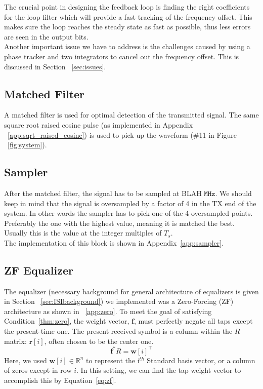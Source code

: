 \documentclass[]{article}
\begin{document}
The crucial point in designing the feedback loop is finding the right coefficients for the loop filter which will provide a fast tracking of the frequency offset. This makes sure the loop reaches the steady state as fast as possible, thus less errors are seen in the output bits. \\

Another important issue we have to address is the challenges caused by using a phase tracker and two integrators to cancel out the frequency offset. This is discussed in Section ~\ref{sec:issues}.


\subsection{Matched Filter}
\label{sec:matched}
A matched filter is used for optimal detection of the transmitted signal. The same square root raised cosine pulse (as implemented in Appendix ~\ref{app:sqrt_raised_cosine}) is used to pick up the waveform (\#11 in Figure ~\ref{fig:system}).

\subsection{Sampler}
\label{sec:sample}
After the matched filter, the signal has to be sampled at BLAH $\mathtt{MHz}$.  We should keep in mind that the signal is oversampled by a factor of 4 in the TX end of the system. In other words the sampler has to pick one of the 4 oversampled points. Preferably the one with the highest value, meaning it is matched the best. Usually this is the value at the integer multiples of  $T_s$. \\

The implementation of this block is shown in Appendix~\ref{app:sampler}.

\subsection{ZF Equalizer}
\label{sec:equal}
The equalizer (necessary background for general architecture of equalizers is given in Section ~\ref{sec:ISIbackground}) we implemented was a Zero-Forcing (ZF) architecture as shown in ~\ref{app:zero}. To meet the goal of satisfying Condition~\ref{thm:zero}, the weight vector, $\mathbf{f}$, must perfectly negate all taps except the present-time one.  The present received symbol is a column within the $R$ matrix: $\mathbf{r}[i]$, often chosen to be the center one.  
$$ \mathbf{f}^{\ast}R = \mathbf{w}[i]^{\top} $$
Here, we used  $\mathbf{w} [i] \in \mathbb{R}^n$ to represent the i$^{th}$ Standard basis vector, or a column of zeros except in row $i$.  In this setting, we can find the tap weight vector to accomplish this by Equation~\ref{eq:zf}. 
\end{document}

